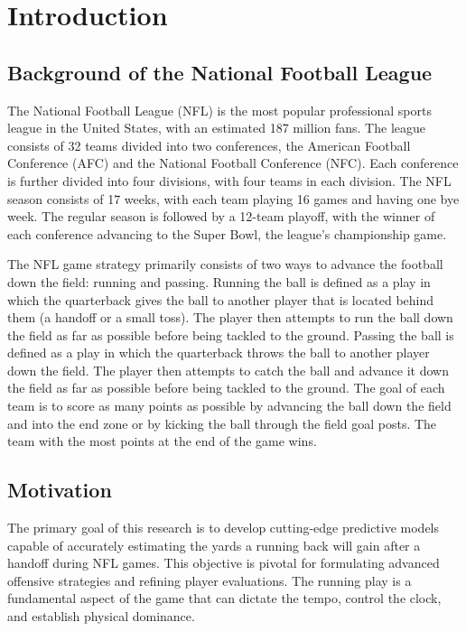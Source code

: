 \documentclass[
  super,
  preprint,
  3p]{elsarticle}
\begin{document}
\hypertarget{introduction}{%
\section{Introduction}\label{introduction}}

\hypertarget{background-of-the-national-football-league}{%
\subsection{Background of the National Football
League}\label{background-of-the-national-football-league}}

The National Football League (NFL) is the most popular professional
sports league in the United States, with an estimated 187 million fans.
The league consists of 32 teams divided into two conferences, the
American Football Conference (AFC) and the National Football Conference
(NFC). Each conference is further divided into four divisions, with four
teams in each division. The NFL season consists of 17 weeks, with each
team playing 16 games and having one bye week. The regular season is
followed by a 12-team playoff, with the winner of each conference
advancing to the Super Bowl, the league's championship game.

The NFL game strategy primarily consists of two ways to advance the
football down the field: running and passing. Running the ball is
defined as a play in which the quarterback gives the ball to another
player that is located behind them (a handoff or a small toss). The
player then attempts to run the ball down the field as far as possible
before being tackled to the ground. Passing the ball is defined as a
play in which the quarterback throws the ball to another player down the
field. The player then attempts to catch the ball and advance it down
the field as far as possible before being tackled to the ground. The
goal of each team is to score as many points as possible by advancing
the ball down the field and into the end zone or by kicking the ball
through the field goal posts. The team with the most points at the end
of the game wins.

\hypertarget{motivation}{%
\subsection{Motivation}\label{motivation}}

The primary goal of this research is to develop cutting-edge predictive
models capable of accurately estimating the yards a running back will
gain after a handoff during NFL games. This objective is pivotal for
formulating advanced offensive strategies and refining player
evaluations. The running play is a fundamental aspect of the game that
can dictate the tempo, control the clock, and establish physical
dominance.
\end{document}
